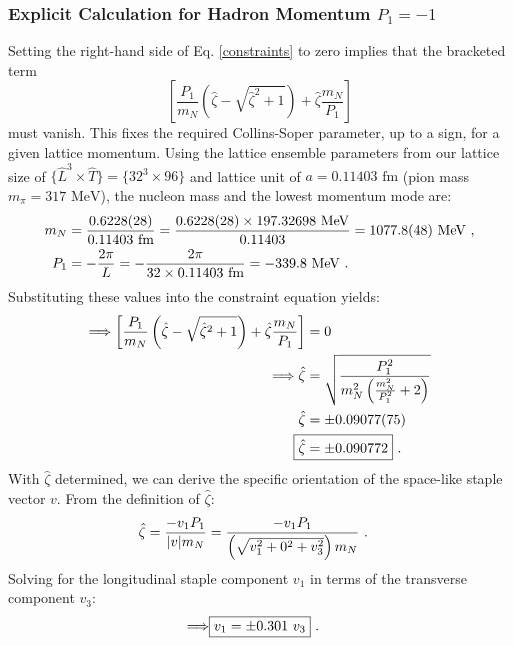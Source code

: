 \subsubsection{Explicit Calculation for Hadron Momentum \texorpdfstring{$P_1=-1$}{P1=-1}}
Setting the right-hand side of Eq. \eqref{constraints} to zero implies that the bracketed term
\begin{equation*}
\left[\frac{P_{1}}{m_{N}}\left(\hat{\zeta}-\sqrt{\hat{\zeta}^2+1}\right)+\hat{\zeta}\frac{m_{N}}{P_{1}}\right]
\end{equation*}
must vanish. This fixes the required Collins-Soper parameter, up to a sign, for a given lattice momentum. Using the lattice ensemble parameters from our lattice size of $\{\hat{L}^3\times\hat{T}\}=\{32^3\times96\}$ and lattice unit of $a=0.11403\text{ fm}$ (pion mass $m_\pi=317\text{ MeV}$), the nucleon mass and the lowest momentum mode are:
\begin{align}
    m_N &= \frac{0.6228(28)}{0.11403\text{ fm}} =  \frac{0.6228(28)\times 197.32698 \text{ MeV}}{0.11403} = 1077.8(48)\text{ MeV} \ , \\
    P_{1}&=-\frac{2\pi}{L}=-\frac{2\pi}{32\times 0.11403\text{ fm}}=-339.8\text{ MeV} \ .
\end{align}
Substituting these values into the constraint equation yields:
\begin{align}
   \Longrightarrow \left[\frac{P_{1}}{m_{N}}\left(\hat{\zeta}-\sqrt{\hat{\zeta}^2+1}\right)+\hat{\zeta}\frac{m_{N}}{P_{1}}\right]&=0 \nonumber \\
    \Longrightarrow \hat{\zeta} &=\sqrt{\frac{P_{1}^2}{m_{N}^{2}\left(\frac{m_{N}^{2}}{P_{1}^{2}}+2\right)}} \nonumber \\
    \hat{\zeta} &= \pm 0.09077(75) \nonumber \\
    \Aboxed{\hat{\zeta} &= \pm 0.090772} \ .
\end{align}
With $\hat{\zeta}$ determined, we can derive the specific orientation of the space-like staple vector $v$. From the definition of $\hat{\zeta}$:
\begin{align}
    \hat{\zeta}&=\frac{-v_{1}P_{1}}{|v|m_N}=\frac{-v_{1}P_{1}}{\left(\sqrt{v_{1}^{2}+0^{2}+v_{3}^{2}}\right)m_{N}} \ .
\end{align}
Solving for the longitudinal staple component $v_1$ in terms of the transverse component $v_3$:
\begin{align}
    \Longrightarrow\Aboxed{v_{1}=\pm 0.301~v_{3}} \ .
\end{align}

